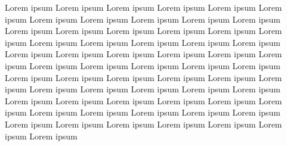 \documentclass[5p]{elsarticle}
\begin{document}
\newpage

Lorem ipsum
Lorem ipsum
Lorem ipsum
Lorem ipsum
Lorem ipsum
Lorem ipsum
Lorem ipsum
Lorem ipsum
Lorem ipsum
Lorem ipsum
Lorem ipsum
Lorem ipsum
Lorem ipsum
Lorem ipsum
Lorem ipsum
Lorem ipsum
Lorem ipsum
Lorem ipsum
Lorem ipsum
Lorem ipsum
Lorem ipsum
Lorem ipsum
Lorem ipsum
Lorem ipsum
Lorem ipsum
Lorem ipsum
Lorem ipsum
Lorem ipsum
Lorem ipsum
Lorem ipsum
Lorem ipsum
Lorem ipsum
Lorem ipsum
Lorem ipsum
Lorem ipsum
Lorem ipsum
Lorem ipsum
Lorem ipsum
Lorem ipsum
Lorem ipsum
Lorem ipsum
Lorem ipsum
Lorem ipsum
Lorem ipsum
Lorem ipsum
Lorem ipsum
Lorem ipsum
Lorem ipsum
Lorem ipsum
Lorem ipsum
Lorem ipsum
Lorem ipsum
Lorem ipsum
Lorem ipsum
Lorem ipsum
Lorem ipsum
Lorem ipsum
Lorem ipsum
Lorem ipsum
Lorem ipsum
Lorem ipsum
Lorem ipsum


\end{document}

